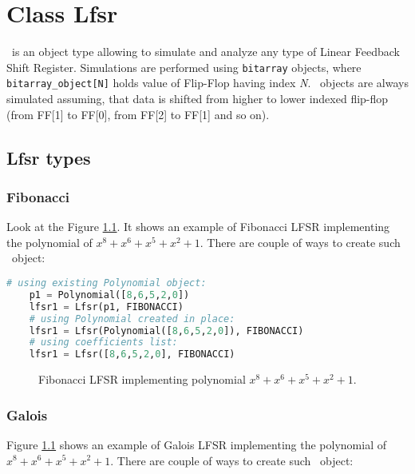 \chapter{Class Lfsr}

\Lfsr\ is an object type allowing to simulate and analyze any type of Linear Feedback Shift Register. Simulations are performed using \texttt{bitarray} objects, where \texttt{bitarray\_object[N]} holds value of Flip-Flop having index \textit{N}. \Lfsr\ objects are always simulated assuming, that data is shifted from higher to lower indexed flip-flop (from FF[1] to FF[0], from FF[2] to FF[1] and so on).

\section{Lfsr types}

\subsection{Fibonacci}


Look at the Figure \ref{lfsr:fibonacci}. It shows an example of Fibonacci LFSR implementing the polynomial of $x^8+x^6+x^5+x^2+1$. There are couple of ways to create such \Lfsr\ object:

\begin{lstlisting}[language=Python]
	# using existing Polynomial object:
	p1 = Polynomial([8,6,5,2,0])
	lfsr1 = Lfsr(p1, FIBONACCI)
	# using Polynomial created in place:
	lfsr1 = Lfsr(Polynomial([8,6,5,2,0]), FIBONACCI)
	# using coefficients list:
	lfsr1 = Lfsr([8,6,5,2,0], FIBONACCI)
\end{lstlisting}

\begin{figure}[h]
	\centering
	\scalebox{.75}{}
	\caption{Fibonacci LFSR implementing polynomial $x^8+x^6+x^5+x^2+1$.}
	\label{lfsr:fibonacci}
\end{figure}

\subsection{Galois}


Figure \ref{lfsr:fibonacci} shows an example of Galois LFSR implementing the polynomial of $x^8+x^6+x^5+x^2+1$. There are couple of ways to create such \Lfsr\ object:

